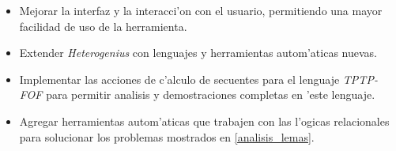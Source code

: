 \begin{itemize}

\item Mejorar la interfaz y la interacci'on con el usuario, permitiendo una mayor facilidad de uso de la herramienta.

\item Extender \textit{Heterogenius} con lenguajes y herramientas autom'aticas nuevas.

\item Implementar las acciones de c'alculo de secuentes para el lenguaje \textit{TPTP-FOF} para permitir analisis y demostraciones completas en 'este lenguaje.

\item Agregar herramientas autom'aticas que trabajen con las l'ogicas relacionales para solucionar los problemas mostrados en \ref{analisis_lemas}.

\end{itemize}



